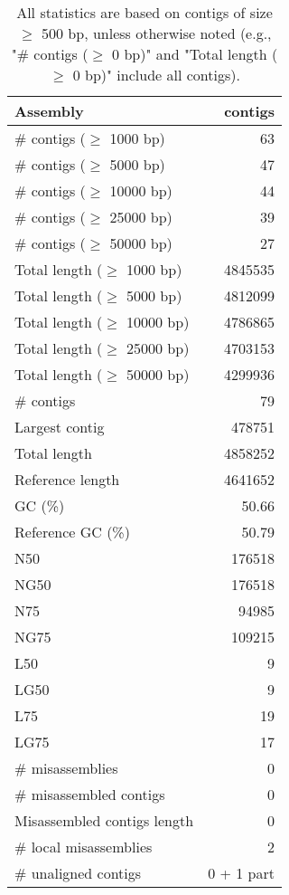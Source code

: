 \documentclass[12pt,a4paper]{article}
\begin{document}
\begin{table}[ht]
\begin{center}
\caption{All statistics are based on contigs of size $\geq$ 500 bp, unless otherwise noted (e.g., "\# contigs ($\geq$ 0 bp)" and "Total length ($\geq$ 0 bp)" include all contigs).}
\begin{tabular}{|l*{1}{|r}|}
\hline
Assembly & contigs \\ \hline
\# contigs ($\geq$ 1000 bp) & 63 \\ \hline
\# contigs ($\geq$ 5000 bp) & 47 \\ \hline
\# contigs ($\geq$ 10000 bp) & 44 \\ \hline
\# contigs ($\geq$ 25000 bp) & 39 \\ \hline
\# contigs ($\geq$ 50000 bp) & 27 \\ \hline
Total length ($\geq$ 1000 bp) & 4845535 \\ \hline
Total length ($\geq$ 5000 bp) & 4812099 \\ \hline
Total length ($\geq$ 10000 bp) & 4786865 \\ \hline
Total length ($\geq$ 25000 bp) & 4703153 \\ \hline
Total length ($\geq$ 50000 bp) & 4299936 \\ \hline
\# contigs & 79 \\ \hline
Largest contig & 478751 \\ \hline
Total length & 4858252 \\ \hline
Reference length & 4641652 \\ \hline
GC (\%) & 50.66 \\ \hline
Reference GC (\%) & 50.79 \\ \hline
N50 & 176518 \\ \hline
NG50 & 176518 \\ \hline
N75 & 94985 \\ \hline
NG75 & 109215 \\ \hline
L50 & 9 \\ \hline
LG50 & 9 \\ \hline
L75 & 19 \\ \hline
LG75 & 17 \\ \hline
\# misassemblies & 0 \\ \hline
\# misassembled contigs & 0 \\ \hline
Misassembled contigs length & 0 \\ \hline
\# local misassemblies & 2 \\ \hline
\# unaligned contigs & 0 + 1 part \\ \hline

\end{tabular}
\end{center}
\end{table}
\end{document}
